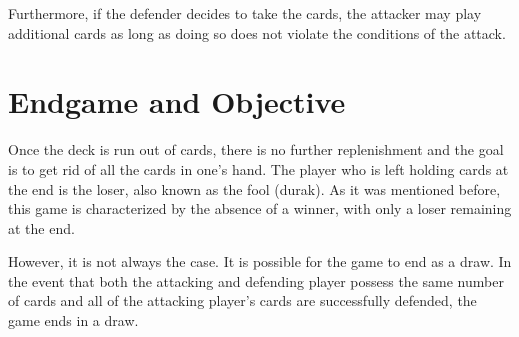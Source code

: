 Furthermore, if the defender decides to take the cards, the attacker may play additional cards as long as doing so does not violate the conditions of the attack.

\section{Endgame and Objective}
Once the deck is run out of cards, there is no further replenishment and the goal is to get rid of all the cards in one's hand. The player who is left holding cards at the end is the loser, also known as the fool (durak). As it was mentioned before, this game is characterized by the absence of a winner, with only a loser remaining at the end. 

However, it is not always the case. It is possible for the game to end as a draw. In the event that both the attacking and defending player possess the same number of cards and all of the attacking player's cards are successfully defended, the game ends in a draw.